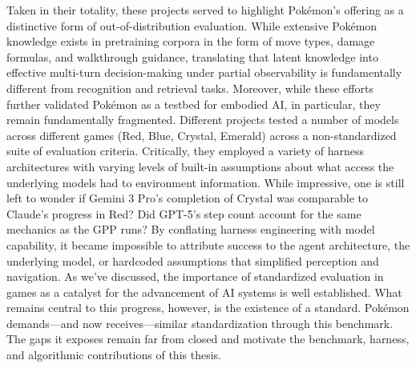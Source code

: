 Taken in their totality, these projects served to highlight Pok\'{e}mon's offering as a distinctive form of out-of-distribution evaluation. While extensive Pok\'{e}mon knowledge exists in pretraining corpora in the form of move types, damage formulas, and walkthrough guidance, translating that latent knowledge into effective multi-turn decision-making under partial observability is fundamentally different from recognition and retrieval tasks. Moreover, while these efforts further validated Pok\'{e}mon as a testbed for embodied AI, in particular, they remain fundamentally fragmented. Different projects tested a number of models across different games (Red, Blue, Crystal, Emerald) across a non-standardized suite of evaluation criteria. Critically, they employed a variety of harness architectures with varying levels of built-in assumptions about what access the underlying models had to environment information. While impressive, one is still left to wonder if Gemini 3 Pro's completion of Crystal was comparable to Claude's progress in Red? Did GPT-5's step count account for the same mechanics as the GPP runs? By conflating harness engineering with model capability, it became impossible to attribute success to the agent architecture, the underlying model, or hardcoded assumptions that simplified perception and navigation. As we've discussed, the importance of standardized evaluation in games as a catalyst for the advancement of AI systems is well established. What remains central to this progress, however, is the existence of a standard. Pok\'{e}mon demands---and now receives---similar standardization through this benchmark. The gaps it exposes remain far from closed and motivate the benchmark, harness, and algorithmic contributions of this thesis.


